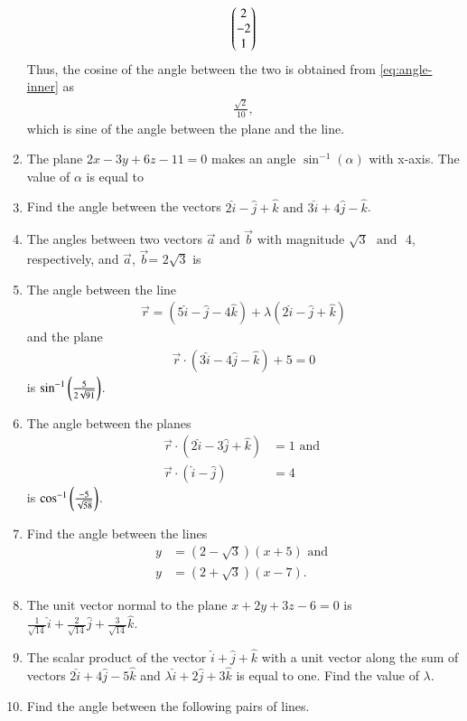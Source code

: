 \begin{enumerate}[label=\thesubsection.\arabic*, ref=\thesubsection.\theenumi]
\begin{align}
\begin{pmatrix}2 \\ -2 \\ 1\end{pmatrix}
\end{align}
Thus,  the cosine of the angle between the two is 
obtained from \eqref{eq:angle-inner} as
\begin{align}
	\frac{\sqrt{2}}{10}, 
\end{align}
which is sine of the angle between the plane and the line.
\item The plane $2x-3y+6z-11=0$ makes an angle $\sin^{-1}(\alpha)$ with x-axis. The value of $\alpha$ is equal to 
\item Find the angle between the vectors $2\hat{i}-\hat{j}+\hat{k}$ $\text{and}$ $3\hat{i}+4\hat{j}-\hat{k}$.
\item The angles between two vectors $\vec{a}$ $\text{and}$ $\vec{b}$ with magnitude $\sqrt{3}$ $\text{ and }$ 4,  respectively,  and $\vec{a}$,  $\vec{b}$= $2\sqrt{3}$ is
\item The angle between the line 
\begin{align}
	\overrightarrow{r}=(5\hat{i}-\hat{j}-4\hat{k})+\lambda(2\hat{i}-\hat{j}+\hat{k})
\end{align}
	and the plane 
\begin{align}
	\overrightarrow{r} \cdot (3\hat{i}-4\hat{j}-\hat{k})+5=0
\end{align}
	is $\sin^{-1}\left(\frac{5}{2\sqrt{91}}\right)$.
\item The angle between the planes 
\begin{align}
	\overrightarrow{r} \cdot (2\hat{i}-3\hat{j}+\hat{k})&=1 
	\text{ and }
	\\
	\overrightarrow{r} \cdot (\hat{i}-\hat{j})&=4  
\end{align}
is
	$\cos^{-1} \left(\frac{-5}{\sqrt{58}}\right)$.
\item Find the angle between the lines 
\begin{align}
	y&=(2-\sqrt{3})(x+5)\text{ and }
	\\
	y&=(2+\sqrt{3})(x-7).
\end{align}
\item The unit vector normal to the plane $x+2y+3z-6=0$ is $\frac{1}{\sqrt{14}}\hat{i} + \frac{2}{\sqrt{14}}\hat{j} + \frac{3}{\sqrt{14}}\hat{k}$.
\item The scalar product of the vector $\hat{i}+\hat{j}+\hat{k}$ with a unit vector along the sum of vectors $2\hat{i}+4\hat{j}-5\hat{k}$ and $\lambda\hat{i}+2\hat{j}+3\hat{k}$ is equal to one. Find the value of $\lambda$.
\item  Find the angle between the following pairs of lines.

\end{enumerate}
